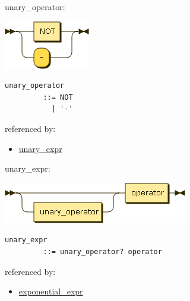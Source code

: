 \begin{minipage}{\textwidth}
\protect\hypertarget{unary_operator}{}{unary\_operator:}

\includegraphics[width=1.47917in,height=0.83333in]{diagram/unary_operator.png}

\begin{verbatim}
unary_operator
         ::= NOT
           | '-'
\end{verbatim}

referenced by:

\begin{itemize}
\tightlist
\item
  \protect\hyperlink{unary_expr}{unary\_expr}
\end{itemize}

\end{minipage}

\begin{minipage}{\textwidth}
\protect\hypertarget{unary_expr}{}{unary\_expr:}

\includegraphics[width=3.16667in,height=0.70833in]{diagram/unary_expr.png}

\begin{verbatim}
unary_expr
         ::= unary_operator? operator
\end{verbatim}

referenced by:

\begin{itemize}
\tightlist
\item
  \protect\hyperlink{exponential_expr}{exponential\_expr}
\end{itemize}

\end{minipage}

